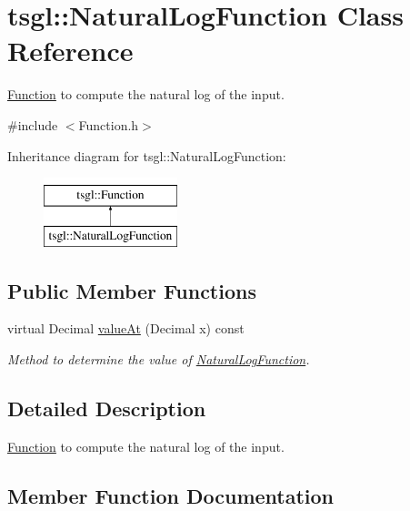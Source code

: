 \hypertarget{classtsgl_1_1_natural_log_function}{}\section{tsgl\+:\+:Natural\+Log\+Function Class Reference}
\label{classtsgl_1_1_natural_log_function}


\hyperlink{classtsgl_1_1_function}{Function} to compute the natural log of the input.  




{\ttfamily \#include $<$Function.\+h$>$}

Inheritance diagram for tsgl\+:\+:Natural\+Log\+Function\+:\begin{figure}[H]
\begin{center}
\leavevmode
\includegraphics[height=2.000000cm]{classtsgl_1_1_natural_log_function}
\end{center}
\end{figure}
\subsection*{Public Member Functions}
\begin{DoxyCompactItemize}
\item 
virtual Decimal \hyperlink{classtsgl_1_1_natural_log_function_a21ce8c1cad8b13dccf9308c73a48df12}{value\+At} (Decimal x) const 
\begin{DoxyCompactList}\small\item\em Method to determine the value of \hyperlink{classtsgl_1_1_natural_log_function}{Natural\+Log\+Function}. \end{DoxyCompactList}\end{DoxyCompactItemize}


\subsection{Detailed Description}
\hyperlink{classtsgl_1_1_function}{Function} to compute the natural log of the input. 

\subsection{Member Function Documentation}
\hypertarget{classtsgl_1_1_natural_log_function_a21ce8c1cad8b13dccf9308c73a48df12}{}

